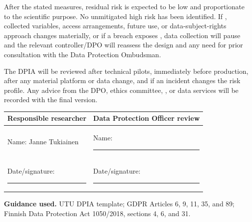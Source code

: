 After the stated measures, residual risk is expected to be low and proportionate to the scientific purpose. No unmitigated high risk has been identified. If , collected variables, access arrangements, future use, or data-subject-rights approach changes materially, or if a breach exposes , data collection will pause and the relevant controller/DPO will reassess the design and any need for prior consultation with the Data Protection Ombudsman.

The DPIA will be reviewed after technical pilots, immediately before production, after any material platform or data change, and if an incident changes the risk profile. Any advice from the DPO, ethics committee, , or data services will be recorded with the final version.

\vspace{1em}
\begin{tabularx}{\textwidth}{@{}X X@{}}
\toprule
Responsible researcher & Data Protection Officer review \\
\midrule
Name: Janne Tukiainen & Name: \rule{5cm}{0.3pt} \\
Date/signature: \rule{5cm}{0.3pt} & Date/signature: \rule{5cm}{0.3pt} \\
\bottomrule
\end{tabularx}

\enlargethispage{2\baselineskip}
{\footnotesize\textbf{\color{UTUBlue}Guidance used.} UTU DPIA template; GDPR Articles 6, 9, 11, 35, and 89; Finnish Data Protection Act 1050/2018, sections 4, 6, and 31.\par}



